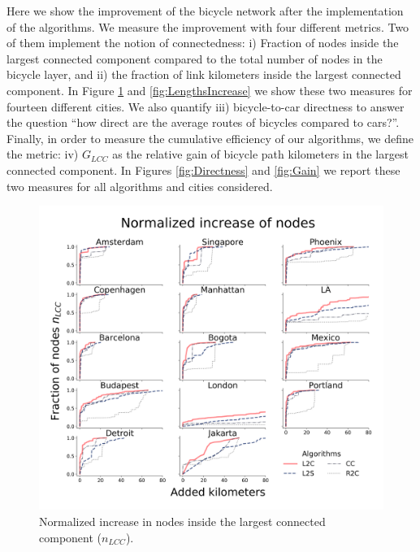 Here we show the improvement of the bicycle network after the implementation of the algorithms. We measure the improvement with four different metrics. Two of them implement the notion of connectedness: i) Fraction of nodes inside the largest connected component compared to the total number of nodes in the bicycle layer, and ii) the fraction of link kilometers inside the largest connected component. In Figure \ref{fig:NodesIncrease} and \ref{fig:LengthsIncrease} we show these two measures for fourteen different cities. We also quantify iii) bicycle-to-car directness to answer the question ``how direct are the average routes of bicycles compared to cars?''. Finally, in order to measure the cumulative efficiency of our algorithms, we define the metric: iv) $G_{LCC}$ as the relative gain of bicycle path kilometers in the largest connected component. In Figures \ref{fig:Directness} and \ref{fig:Gain} we report these two measures for all algorithms and cities considered.

\begin{figure}[h!]
  \centering
  \includegraphics[width=\textwidth]{images/datadriven/SI_Nodes.png}
  \caption{Normalized increase in nodes inside the largest connected component ($n_{LCC}$).}
  \label{fig:NodesIncrease}
\end{figure}

